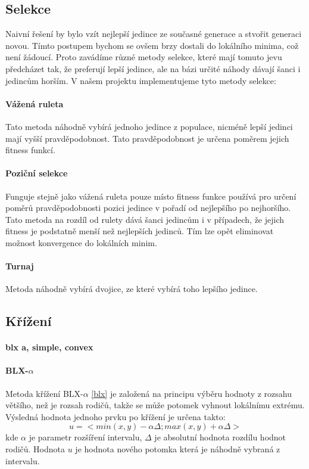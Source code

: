 \documentclass[a4paper,11pt]{scrartcl}
\begin{document}
\subsection{Selekce}
Naivní řešení by bylo vzít nejlepší jedince ze současné generace a stvořit generaci novou. Tímto postupem bychom se ovšem brzy dostali do lokálního minima, což není žádoucí. Proto zavádíme různé metody selekce, které mají tomuto jevu předcházet tak, že preferují lepší jedince, ale na bázi určité náhody dávají šanci i jedincům horším. V našem projektu implementujeme tyto metody selekce:

\paragraph{Vážená ruleta}
Tato metoda náhodně vybírá jednoho jedince z populace, nicméně lepší jedinci mají vyšší pravděpodobnost. Tato pravděpodobnost je určena poměrem jejich fitness funkcí.

\paragraph{Poziční selekce}
Funguje stejně jako vážená ruleta pouze místo fitness funkce používá pro určení poměrů pravděpodobnosti pozici jedince v pořadí od nejlepšího po nejhoršího. Tato metoda na rozdíl od rulety dává šanci jedincům i v případech, že jejich fitness je podstatně menší než nejlepších jedinců. Tím lze opět eliminovat možnost konvergence do lokálních minim.

\paragraph{Turnaj}
Metoda náhodně vybírá dvojice, ze které vybírá toho lepšího jedince.

\subsection{Křížení}

\paragraph{blx a, simple, convex}

\paragraph{BLX-$\alpha$}
Metoda křížení BLX-$\alpha$ \ref{blx} je založená na principu výběru hodnoty z rozsahu většího, než je rozsah rodičů, takže se může potomek vyhnout lokálnímu extrému.\\
Výsledná hodnota jednoho prvku po křížení je určena takto:
\begin{equation}
    u = <min(x,y) - \alpha \Delta; max(x,y) + \alpha \Delta>
\end{equation}
kde $\alpha$ je parametr rozšíření intervalu, $\Delta$ je absolutní hodnota rozdílu hodnot rodičů. Hodnota $u$ je hodnota nového potomka která je náhodně vybraná z intervalu.
\end{document}
